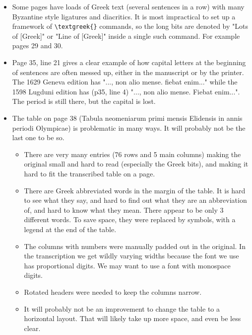 \documentclass{report}
\begin{document}
\begin{itemize}
\item
Some pages have loads of Greek text (several sentences in a row) with many
Byzantine style ligatures and diacritics. It is most impractical to set up
a framework of \verb+\textgreek{}+ commands, so the long bits are denoted
by "Lots of [Greek]" or "Line of [Greek]" inside a single such command.
For example pages 29 and 30.
\item
Page 35, line 21 gives a clear example of how capital letters at the beginning
of sentences are often messed up, either in the manuscript or by the printer.
The 1629 Geneva edition has "..., non alio mense. fiebat enim..." while the
1598 Lugduni edition has (p35, line 4) "..., non alio mense. Fiebat enim...".
The period is still there, but the capital is lost.
\item
The table on page 38 (Tabula neomeniarum primi mensis Elidensis in annis
periodi Olympicae) is problematic in many ways. It will probably not be 
the last one to be so.
\begin{itemize}
  \item{}There are very many entries (76 rows and 5 main columns) making the
  original small and hard to read (especially the Greek bits), and making it
  hard to fit the transcribed table on a page.
  \item{}There are Greek abbreviated words in the margin of the table. It is
  hard to see what they say, and hard to find out what they are an abbreviation
  of, and hard to know what they mean. There appear to be only 3 different
  words. To save space, they were replaced by symbols, with a legend at the
  end of the table.
  \item{}The columns with numbers were manually padded out in the original.
  In the transcription we get wildly varying widths  because the font we use
  has proportional digits. We may want to use a font with monospace digits.
  \item{}Rotated headers were needed to keep the columns narrow.
  \item{}It will probably not be an improvement to change the table to a
  horizontal layout. That will likely take up more space, and even be
  less clear.
\end{itemize}
\end{itemize}

\end{document}
